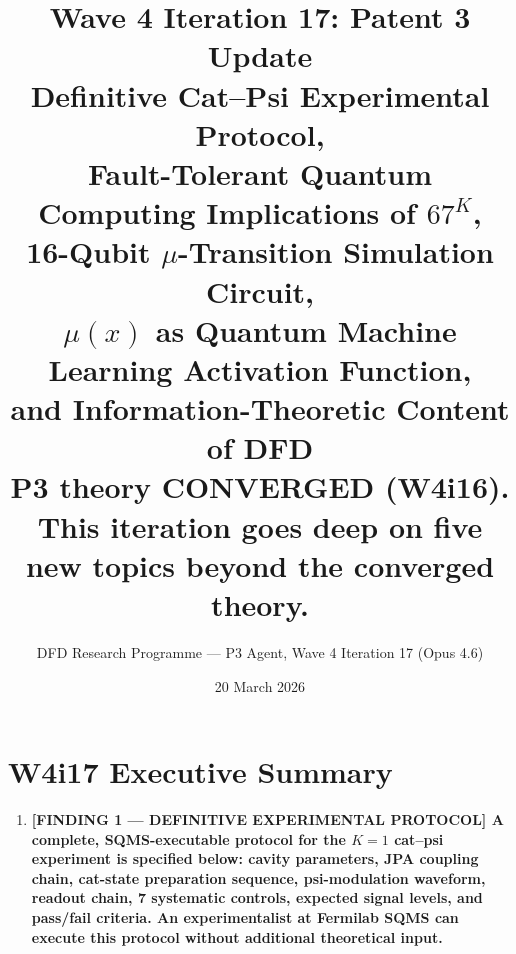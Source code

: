 \documentclass[11pt]{article}
\title{\textbf{Wave 4 Iteration 17: Patent 3 Update}\\[6pt]
Definitive Cat--Psi Experimental Protocol,\\
Fault-Tolerant Quantum Computing Implications of $67^K$,\\
16-Qubit $\mu$-Transition Simulation Circuit,\\
$\mu(x)$ as Quantum Machine Learning Activation Function,\\
and Information-Theoretic Content of DFD\\[4pt]
{\normalsize P3 theory CONVERGED (W4i16). This iteration goes deep on
five new topics beyond the converged theory.}}
\author{DFD Research Programme --- P3 Agent, Wave 4 Iteration 17 (Opus 4.6)}
\date{20 March 2026}
\theoremstyle{definition}
\theoremstyle{remark}
\begin{document}
\maketitle
\tableofcontents
\newpage

\section*{W4i17 Executive Summary}

\begin{tcolorbox}[colback=blue!5!white, colframe=blue!60!black,
  title=\textbf{W4i17 TOP 5 FINDINGS --- READ FIRST}]
\begin{enumerate}[nosep]

\item \textbf{[FINDING 1 --- DEFINITIVE EXPERIMENTAL PROTOCOL] A complete,
  SQMS-executable protocol for the $K=1$ cat--psi experiment is specified
  below: cavity parameters, JPA coupling chain, cat-state preparation
  sequence, psi-modulation waveform, readout chain, 7 systematic
  controls, expected signal levels, and pass/fail criteria. An
  experimentalist at Fermilab SQMS can execute this protocol without
  additional theoretical input.}


\end{enumerate}
\end{tcolorbox}
\end{document}
